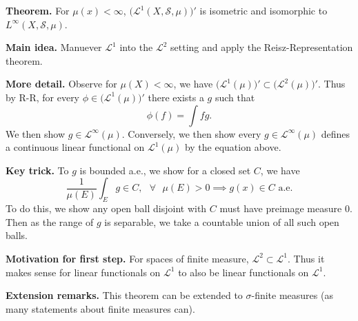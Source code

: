 \documentclass[12pt, letterpaper]{article}
\newcommand{\s}{\sigma}
\newcommand{\cL}{{\mathcal L}}
\newcommand{\cS}{{\mathcal S}}
\renewcommand{\i}{\infty}
\begin{document}
\textbf{Theorem.} For $\mu(x) < \i$, $\Big(\cL^1(X, \cS, \mu)\Big)'$ is isometric and isomorphic to $L^\i(X, \cS, \mu)$.

\textbf{Main idea.} Manuever $\cL^1$ into the $\cL^2$ setting and apply the Reisz-Representation theorem.

\textbf{More detail.} Observe for $\mu(X) < \i$, we have $\big(\cL^1(\mu)\big)' \subset \big(\cL^2(\mu)\big)'$. Thus by R-R, for every $\phi \in \big(\cL^1(\mu)\big)'$ there exists a $g$ such that
\[
    \phi(f) = \int fg.
\]
We then show $g \in \cL^\i(\mu)$. Conversely, we then show every $g \in \cL^\i(\mu)$ defines a continuous linear functional on $\cL^1(\mu)$ by the equation above.

\textbf{Key trick.} To $g$ is bounded a.e., we show for a closed set $C$, we have
\[
    \frac{1}{\mu(E)}\int_E g \in C, \text{  } \forall \text{ } \mu(E) > 0 \implies g(x) \in C \text{ a.e.}
\]
To do this, we show any open ball disjoint with $C$ must have preimage measure 0. Then as the range of $g$ is separable, we take a countable union of all such open balls.

\textbf{Motivation for first step.} For spaces of finite measure, $\cL^2 \subset \cL^1$. Thus it makes sense for linear functionals on $\cL^1$ to also be linear functionals on $\cL^1$.

\textbf{Extension remarks.} This theorem can be extended to $\s$-finite measures (as many statements about finite measures can).
\end{document}
